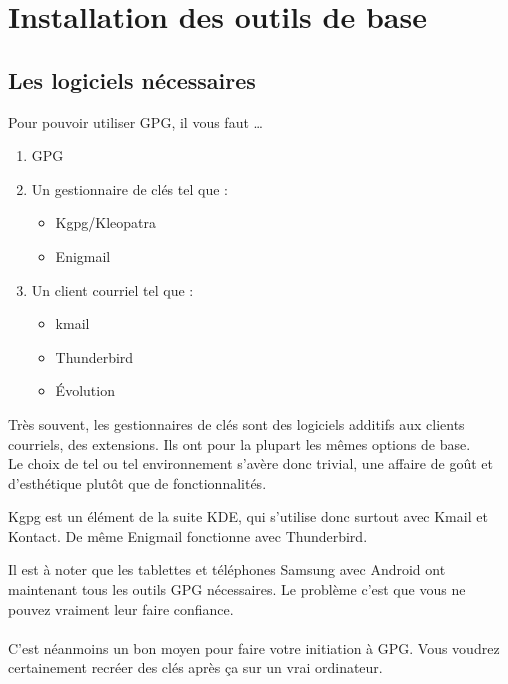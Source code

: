 \chapter{Installation des outils de base}

\section{Les logiciels nécessaires}\label{les-logiciels-nuxe9cessaires}

Pour pouvoir utiliser GPG, il vous faut \ldots{}

\begin{enumerate}
\def\labelenumi{\arabic{enumi}.}
\itemsep1pt\parskip0pt
\item
  GPG
\item
  Un gestionnaire de clés tel que :

  \begin{itemize}
  \itemsep1pt\parskip0pt
  \item
    Kgpg/Kleopatra
  \item
    Enigmail
  \end{itemize}
\item
  Un client courriel tel que :

  \begin{itemize}
  \itemsep1pt\parskip0pt
  \item
    kmail
  \item
    Thunderbird
  \item
    Évolution
  \end{itemize}
\end{enumerate}

Très souvent, les gestionnaires de clés sont des logiciels additifs aux
clients courriels, des extensions. Ils ont pour la plupart les mêmes
options de base.\\Le choix de tel ou tel environnement s'avère donc
trivial, une affaire de goût et d'esthétique plutôt que de
fonctionnalités.

Kgpg est un élément de la suite KDE, qui s'utilise donc surtout avec
Kmail et Kontact. De même Enigmail fonctionne avec Thunderbird.

\begin{notice}
	Il est à noter que les tablettes et téléphones Samsung avec
Android ont maintenant tous les outils GPG nécessaires. Le problème
c'est que vous ne pouvez vraiment leur faire confiance.\\
\\
C'est néanmoins un bon moyen pour faire votre initiation à GPG.
Vous voudrez certainement recréer des clés après ça sur un vrai
ordinateur.
\end{notice}

